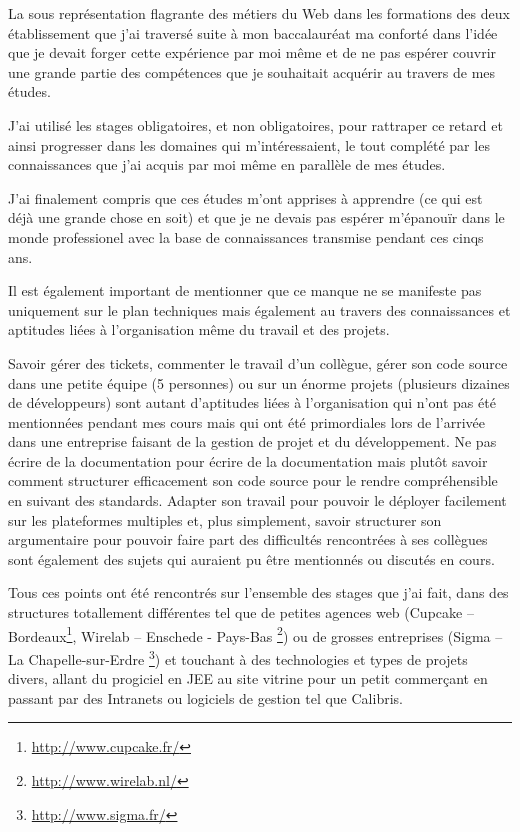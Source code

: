 \documentclass[12pt,a4paper]{book}
\begin{document}
La sous représentation flagrante des métiers du Web dans les formations des deux établissement que j'ai traversé suite à mon baccalauréat ma conforté dans l'idée que je devait forger cette expérience par moi même et de ne pas espérer couvrir une grande partie des compétences que je souhaitait acquérir au travers de mes études.

J'ai utilisé les stages obligatoires, et non obligatoires, pour rattraper ce retard et ainsi progresser dans les domaines qui m'intéressaient, le tout complété par les connaissances que j'ai acquis par moi même en parallèle de mes études.

J'ai finalement compris que ces études m'ont apprises à apprendre (ce qui est déjà une grande chose en soit) et que je ne devais pas espérer m'épanouïr dans le monde professionel avec la base de connaissances transmise pendant ces cinqs ans.

Il est également important de mentionner que ce manque ne se manifeste pas uniquement sur le plan techniques mais également au travers des connaissances et aptitudes liées à l'organisation même du travail et des projets. 

Savoir gérer des tickets, commenter le travail d'un collègue, gérer son code source dans une petite équipe (5 personnes) ou sur un énorme projets (plusieurs dizaines de développeurs) sont autant d'aptitudes liées à l'organisation qui n'ont pas été mentionnées pendant mes cours mais qui ont été primordiales lors de l'arrivée dans une entreprise faisant de la gestion de projet et du développement.
Ne pas écrire de la documentation pour écrire de la documentation mais plutôt savoir comment structurer efficacement son code source pour le rendre compréhensible en suivant des standards. Adapter son travail pour pouvoir le déployer facilement sur les plateformes multiples et, plus simplement, savoir structurer son argumentaire pour pouvoir faire part des difficultés rencontrées à ses collègues sont également des sujets qui auraient pu être mentionnés ou discutés en cours. 

Tous ces points ont été rencontrés sur l'ensemble des stages que j'ai fait, dans des structures totallement différentes tel que de petites agences web (Cupcake -- Bordeaux\footnote{\url{http://www.cupcake.fr/}}, Wirelab -- Enschede - Pays-Bas \footnote{\url{http://www.wirelab.nl/}}) ou de grosses entreprises (Sigma -- La Chapelle-sur-Erdre \footnote{\url{http://www.sigma.fr/}}) et touchant à des technologies et types de projets divers, allant du progiciel en JEE au site vitrine pour un petit commerçant en passant par des Intranets ou logiciels de gestion tel que Calibris.
\end{document}
